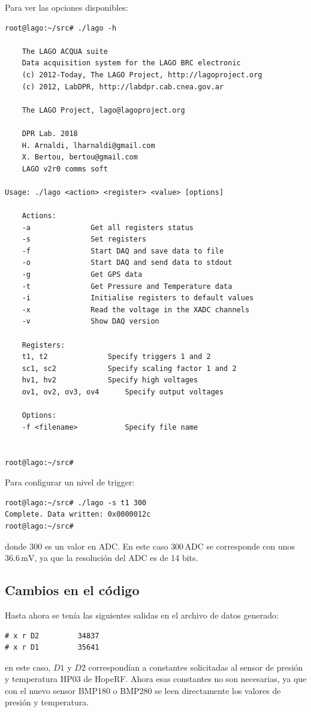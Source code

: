 \documentclass[a4paper,11pt]{article}
\begin{document}
\noindent Para ver las opciones disponibles:
\begin{verbatim}
root@lago:~/src# ./lago -h

	The LAGO ACQUA suite
	Data acquisition system for the LAGO BRC electronic
	(c) 2012-Today, The LAGO Project, http://lagoproject.org
	(c) 2012, LabDPR, http://labdpr.cab.cnea.gov.ar

	The LAGO Project, lago@lagoproject.org

	DPR Lab. 2018
	H. Arnaldi, lharnaldi@gmail.com
	X. Bertou, bertou@gmail.com
	LAGO v2r0 comms soft

Usage: ./lago <action> <register> <value> [options]

	Actions:
	-a				Get all registers status
	-s				Set registers
	-f				Start DAQ and save data to file
	-o				Start DAQ and send data to stdout
	-g				Get GPS data
	-t				Get Pressure and Temperature data
	-i				Initialise registers to default values
	-x				Read the voltage in the XADC channels
	-v				Show DAQ version

	Registers:
	t1, t2				Specify triggers 1 and 2
	sc1, sc2			Specify scaling factor 1 and 2
	hv1, hv2			Specify high voltages
	ov1, ov2, ov3, ov4		Specify output voltages

	Options:
	-f <filename>			Specify file name


root@lago:~/src# 

\end{verbatim}

\noindent Para configurar un nivel de trigger:
\begin{verbatim}
root@lago:~/src# ./lago -s t1 300
Complete. Data written: 0x0000012c
root@lago:~/src# 
\end{verbatim}

\noindent donde 300 es un valor en ADC. En este caso $300\,\text{ADC}$ se
corresponde con unos $36.6\,\text{mV}$, ya que la resolución del ADC es de 14
bits.

\subsection{Cambios en el código}
Hasta ahora se tenía las siguientes salidas en el archivo de datos generado:

\begin{verbatim}
# x r D2         34837
# x r D1         35641
\end{verbatim}

\noindent en este caso, $D1$ y $D2$ correspondían a constantes solicitadas al
sensor de presión y temperatura HP03 de HopeRF. Ahora esas constantes no son
necesarias, ya que con el nuevo sensor BMP180 o BMP280 se leen directamente los
valores de presión y temperatura.
\end{document}
